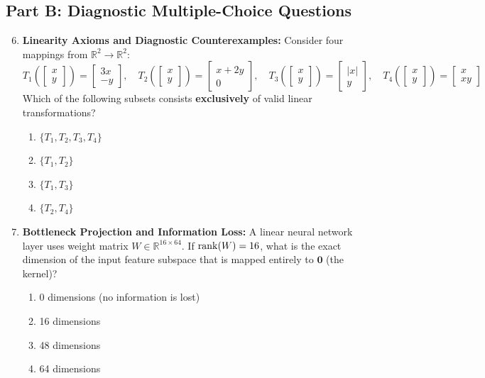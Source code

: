 \subsection*{Part B: Diagnostic Multiple-Choice Questions}
\begin{enumerate}
\setcounter{enumi}{5}
\item \textbf{Linearity Axioms and Diagnostic Counterexamples:} Consider four mappings from $\mathbb{R}^2 \to \mathbb{R}^2$:
\begin{equation*}
T_1\left(\begin{bmatrix} x \\ y \end{bmatrix}\right) = \begin{bmatrix} 3x \\ -y \end{bmatrix}, \quad T_2\left(\begin{bmatrix} x \\ y \end{bmatrix}\right) = \begin{bmatrix} x + 2y \\ 0 \end{bmatrix}, \quad T_3\left(\begin{bmatrix} x \\ y \end{bmatrix}\right) = \begin{bmatrix} |x| \\ y \end{bmatrix}, \quad T_4\left(\begin{bmatrix} x \\ y \end{bmatrix}\right) = \begin{bmatrix} x \\ x y \end{bmatrix}
\end{equation*}
Which of the following subsets consists \textbf{exclusively} of valid linear transformations?
\begin{enumerate}
    \item $\{T_1, T_2, T_3, T_4\}$
    \item $\{T_1, T_2\}$
    \item $\{T_1, T_3\}$
    \item $\{T_2, T_4\}$
\end{enumerate}

\item \textbf{Bottleneck Projection and Information Loss:} A linear neural network layer uses weight matrix $W \in \mathbb{R}^{16 \times 64}$. If $\operatorname{rank}(W) = 16$, what is the exact dimension of the input feature subspace that is mapped entirely to $\mathbf{0}$ (the kernel)?
\begin{enumerate}
    \item 0 dimensions (no information is lost)
    \item 16 dimensions
    \item 48 dimensions
    \item 64 dimensions
\end{enumerate}
\end{enumerate}
